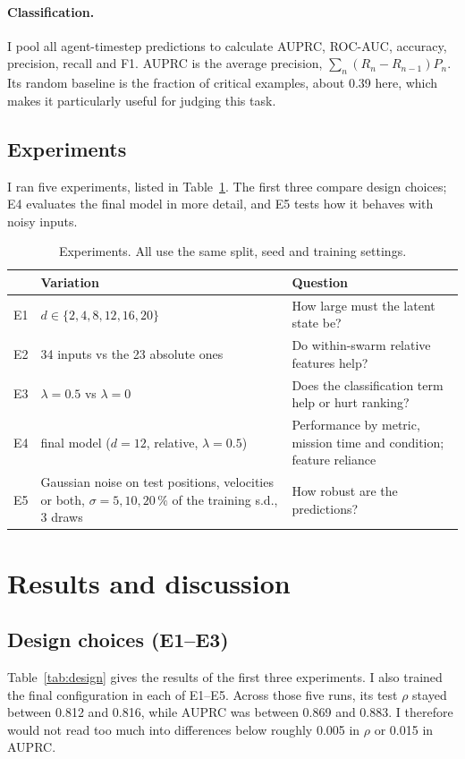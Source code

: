 \documentclass[11pt,a4paper]{article}
\begin{document}
\paragraph{Classification.} I pool all agent-timestep predictions to calculate AUPRC, ROC-AUC, accuracy,
precision, recall and F1. AUPRC is the average precision,
$\sum_n(R_n-R_{n-1})P_n$. Its random baseline is the fraction of critical examples, about 0.39 here,
which makes it particularly useful for judging this task.

\subsection{Experiments}
I ran five experiments, listed in Table~\ref{tab:exp}. The first three compare design choices; E4 evaluates
the final model in more detail, and E5 tests how it behaves with noisy inputs.

\begin{table}[!htbp]\centering\small
\caption{Experiments. All use the same split, seed and training settings.}\label{tab:exp}
\begin{tabular}{@{}lp{6.2cm}p{6.6cm}@{}}\toprule
 & Variation & Question\\\midrule
E1 & $d\in\{2,4,8,12,16,20\}$ & How large must the latent state be?\\
E2 & 34 inputs vs the 23 absolute ones & Do within-swarm relative features help?\\
E3 & $\lambda=0.5$ vs $\lambda=0$ & Does the classification term help or hurt ranking?\\
E4 & final model ($d=12$, relative, $\lambda=0.5$) & Performance by metric, mission time and condition; feature reliance\\
E5 & Gaussian noise on test positions, velocities or both, $\sigma=5,10,20\,\%$ of the training s.d., 3 draws & How robust are the predictions?\\\bottomrule
\end{tabular}
\end{table}

\section{Results and discussion}\label{sec:results}

\FloatBarrier
\subsection{Design choices (E1--E3)}\label{sec:design}
Table~\ref{tab:design} gives the results of the first three experiments. I also trained the final configuration
in each of E1--E5. Across those five runs, its test $\rho$ stayed between 0.812 and 0.816, while AUPRC was
between 0.869 and 0.883. I therefore would not read too much into differences below roughly 0.005 in $\rho$
or 0.015 in AUPRC.
\end{document}
